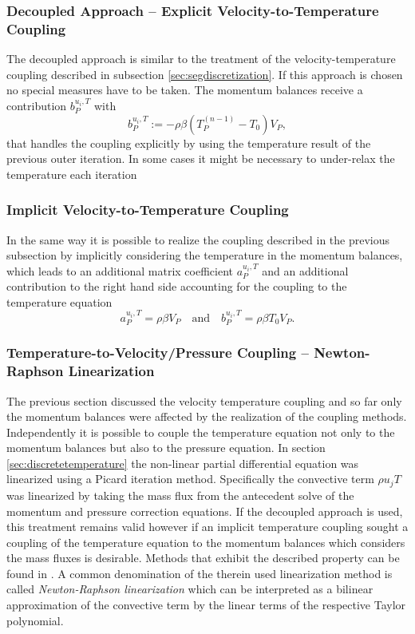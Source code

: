\subsubsection{Decoupled Approach -- Explicit Velocity-to-Temperature Coupling}

The decoupled approach is similar to the treatment of the velocity-temperature coupling described in subsection \ref{sec:segdiscretization}. If this approach is chosen no special measures have to be taken. The momentum balances receive a contribution \( b_P^{u_i,T}\) with
\begin{displaymath}
  b_P^{u_i,T} := - \rho \beta \left( T_P^{(n-1)} - T_0 \right) V_P,
\end{displaymath}
that handles the coupling explicitly by using the temperature result of the previous outer iteration. In some cases it might be necessary to under-relax the temperature each iteration

\subsubsection{Implicit Velocity-to-Temperature Coupling}

In the same way it is possible to realize the coupling described in the previous subsection by implicitly considering the temperature in the momentum balances, which leads to an additional matrix coefficient \(a_P^{u_i,T}\) and an additional contribution to the right hand side accounting for the coupling to the temperature equation
\begin{displaymath}
  a_P^{u_i,T} = \rho \beta V_P 
  \quad \text{and} \quad
  b_P^{u_i,T} = \rho \beta T_0 V_P.
\end{displaymath}

\subsubsection{Temperature-to-Velocity/Pressure Coupling -- Newton-Raphson Linearization}

The previous section discussed the velocity temperature coupling and so far only the momentum balances were affected by the realization of the coupling methods. Independently it is possible to couple the temperature equation not only to the momentum balances but also to the pressure equation. In section \ref{sec:discretetemperature} the non-linear partial differential equation was linearized using a Picard iteration method. Specifically the convective term \(\rho u_j T\) was linearized by taking the mass flux from the antecedent solve of the momentum and pressure correction equations. If the decoupled approach is used, this treatment remains valid however if an implicit temperature coupling sought a coupling of the temperature equation to the momentum balances which considers the mass fluxes is desirable. Methods that exhibit the described property can be found in \cite{galpin86,oliveira01,sheu04,vakilipour12}. A common denomination of the therein used linearization method is called \emph{Newton-Raphson linearization} which can be interpreted as a bilinear approximation of the convective term by the linear terms of the respective Taylor polynomial.

